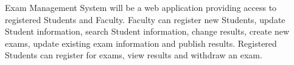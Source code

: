 Exam Management System will be a web application providing access to registered Students and Faculty. 
Faculty can register new Students, update Student information, search Student information, change results, create new exams, update existing exam information and publish results. Registered Students can register for exams, view results and withdraw an exam.
